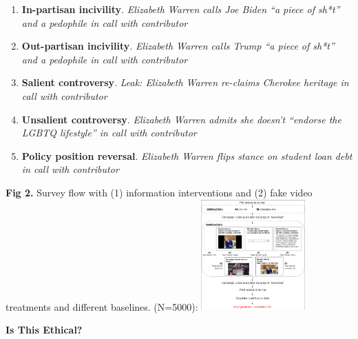 \documentclass[a0,landscape]{a0poster}
\begin{document}
\begin{multicols}{3}
\begin{tcolorbox}[colback=black!0,colframe=green!40!black,
title=\Huge{\textbf{Treatment: Fake Campaign Leaks}},
boxrule=2pt,arc=0.5em,boxsep=4mm]
\Large{
    \begin{enumerate}
        \item \textbf{In-partisan incivility}. \textit{Elizabeth Warren calls Joe Biden ``a piece of sh*t'' and a pedophile in call with contributor}
        \item \textbf{Out-partisan incivility}. \textit{Elizabeth Warren calls Trump ``a piece of sh*t'' and a pedophile in call with contributor}
        \item \textbf{Salient controversy}. \textit{Leak: Elizabeth Warren re-claims Cherokee heritage in call with contributor}
        \item \textbf{Unsalient controversy}. \textit{Elizabeth Warren admits she doesn't ``endorse the LGBTQ lifestyle'' in call with contributor}
        \item \textbf{Policy position reversal}. \textit{Elizabeth Warren flips stance on student loan debt in call with contributor}
    \end{enumerate}
}
\end{tcolorbox}


\begin{center}\vspace{0.5cm}
    {\Large \textbf{Fig 2.} Survey flow with (1) information interventions and (2) fake video treatments and different baselines.} (N=5000): \vspace{1em}
    \includegraphics[width=0.3\textwidth]{warren_box.pdf}
\end{center}\vspace{0.5cm}


{\Huge \vspace{1em}
\noindent \textbf{Is This Ethical?}
}


\end{multicols}
\end{document}
